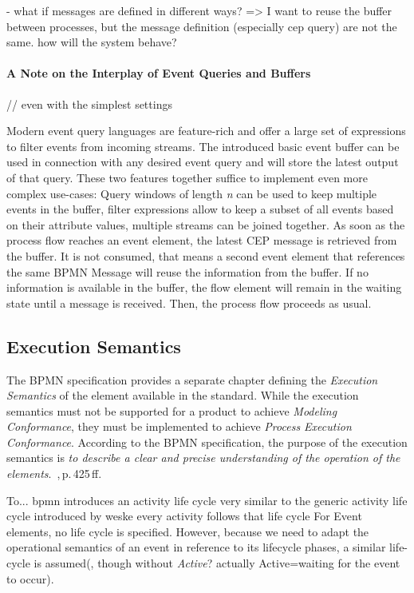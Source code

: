 - what if messages are defined in different ways? => I want to reuse the buffer between processes, but the message definition (especially cep query) are not the same. how will the system behave?

\paragraph{A Note on the Interplay of Event Queries and Buffers}

// even with the simplest settings

Modern event query languages are feature-rich and offer a large set of expressions to filter events from incoming streams. 
The introduced basic event buffer can be used in connection with any desired event query and will store the latest output of that query.
These two features together suffice to implement even more complex use-cases: Query windows of length \textit{n} can be used to keep multiple events in the buffer, filter expressions allow to keep a subset of all events based on their attribute values, multiple streams can be joined together.
As soon as the process flow reaches an event element, the latest CEP message is retrieved from the buffer. It is not consumed, that means a second event element that references the same BPMN Message will reuse the information from the buffer.
If no information is available in the buffer, the flow element will remain in the waiting state until a message is received. Then, the process flow proceeds as usual.

\subsection{Execution Semantics}

The BPMN specification provides a separate chapter defining the \textit{Execution Semantics} of the element available in the standard.
While the execution semantics must not be supported for a product to achieve \textit{Modeling Conformance}, they must be implemented to achieve \textit{Process Execution Conformance}.
According to the BPMN specification, the purpose of the execution semantics is \textit{to describe a clear and precise understanding of the operation of the elements}.~\cite{bpmnspec},\,p.\,425\,ff.

To...
bpmn introduces an activity life cycle very similar to the generic activity life cycle introduced by weske
every activity follows that life cycle
For Event elements, no life cycle is specified. However, because we need to adapt the operational semantics of an event in reference to its lifecycle phases, a similar life-cycle is assumed(, though without \textit{Active}? actually Active=waiting for the event to occur).



